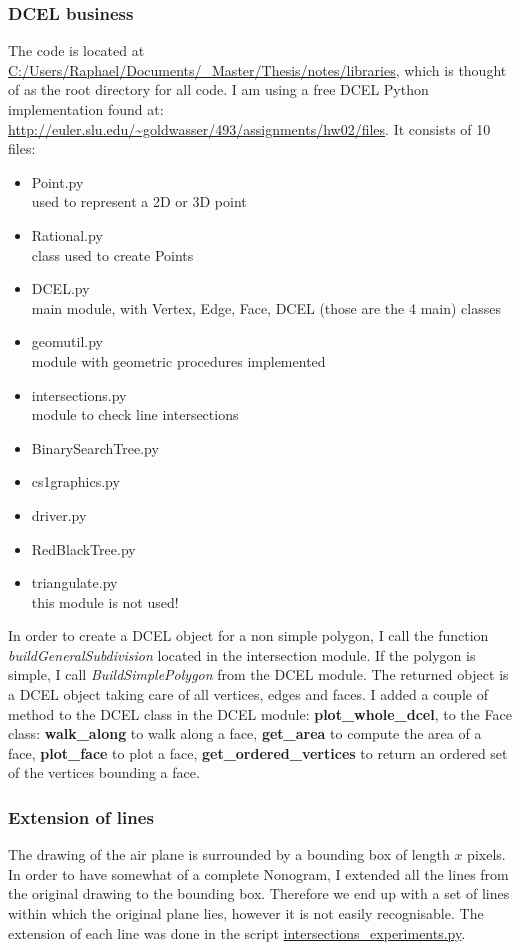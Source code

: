 \documentclass{article}
\begin{document}
\subsubsection{DCEL business}
\label{DCEL_business}
The code is located at \url{C:/Users/Raphael/Documents/_Master/Thesis/notes/libraries}, which is thought of as the root directory for all code. I am using a free DCEL Python implementation found at: \url{http://euler.slu.edu/~goldwasser/493/assignments/hw02/files}. It consists of 10 files:
\begin{itemize}
\item Point.py\\ 
used to represent a 2D or 3D point
\item Rational.py\\
class used to create Points
\item DCEL.py\\
main module, with Vertex, Edge, Face, DCEL (those are the 4 main) classes
\item geomutil.py\\
module with geometric procedures implemented
\item intersections.py\\
module to check line intersections
\item BinarySearchTree.py
\item cs1graphics.py
\item driver.py
\item RedBlackTree.py
\item triangulate.py\\
this module is not used!\\
\end{itemize}


In order to create a DCEL object for a non simple polygon, I call the function \emph{buildGeneralSubdivision} located in the intersection module. If the polygon is simple, I call \emph{BuildSimplePolygon} from the DCEL module. The returned object is a DCEL object taking care of all vertices, edges and faces. I added a couple of method to the DCEL class in the DCEL module: {\bf plot\_whole\_dcel}, to the Face class: {\bf walk\_along} to walk along a face, {\bf get\_area} to compute the area of a face, {\bf plot\_face} to plot a face, {\bf get\_ordered\_vertices} to return an ordered set of the vertices bounding a face.

\subsubsection{Extension of lines}
The drawing of the air plane is surrounded by a bounding box of length $x$ pixels. In order to have somewhat of a complete Nonogram, I extended all the lines from the original drawing to the bounding box. Therefore we end up with a set of lines within which the original plane lies, however it is not easily recognisable. The extension of each line was done in the script \url{intersections_experiments.py}. 
\end{document}
